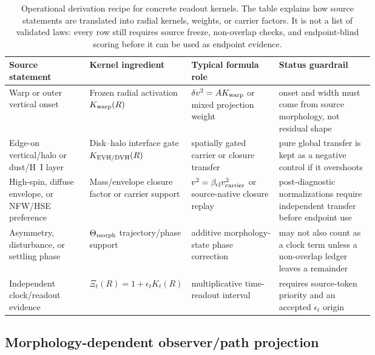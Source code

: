 \documentclass[11pt]{article}
\begin{document}
\begin{table}[H]
\centering
\small
\begin{tabularx}{\linewidth}{@{}p{0.22\linewidth}p{0.24\linewidth}p{0.24\linewidth}X@{}}
\toprule
Source statement & Kernel ingredient & Typical formula role & Status guardrail \\
\midrule
Warp or outer vertical onset &
Frozen radial activation \(K_{\rm warp}(R)\) &
\(\delta v^2=A K_{\rm warp}\) or mixed projection weight &
onset and width must come from source morphology, not residual shape \\
Edge-on vertical/halo or dust/H~I layer &
Disk--halo interface gate \(K_{\rm EVH/DVH}(R)\) &
spatially gated carrier or closure transfer &
pure global transfer is kept as a negative control if it overshoots \\
High-spin, diffuse envelope, or NFW/HSE preference &
Mass/envelope closure factor or carrier support &
\(v^2=\beta_{\rm cl}v_{\rm carrier}^2\) or source-native closure replay &
post-diagnostic normalizations require independent transfer before endpoint use \\
Asymmetry, disturbance, or settling phase &
\(\Theta_{\rm morph}\) trajectory/phase support &
additive morphology-state phase correction &
may not also count as a clock term unless a non-overlap ledger leaves a remainder \\
Independent clock/readout evidence &
\(\Xi_t(R)=1+\epsilon_tK_t(R)\) &
multiplicative time-readout interval &
requires source-token priority and an accepted \(\epsilon_t\) origin \\
\bottomrule
\end{tabularx}
\caption{Operational derivation recipe for concrete readout kernels.  The table
explains how source statements are translated into radial kernels, weights, or
carrier factors.  It is not a list of validated laws: every row still requires
source freeze, non-overlap checks, and endpoint-blind scoring before it can be
used as endpoint evidence.}
\label{tab:kernel-derivation-recipe}
\end{table}

\subsection{Morphology-dependent observer/path projection}
\end{document}

